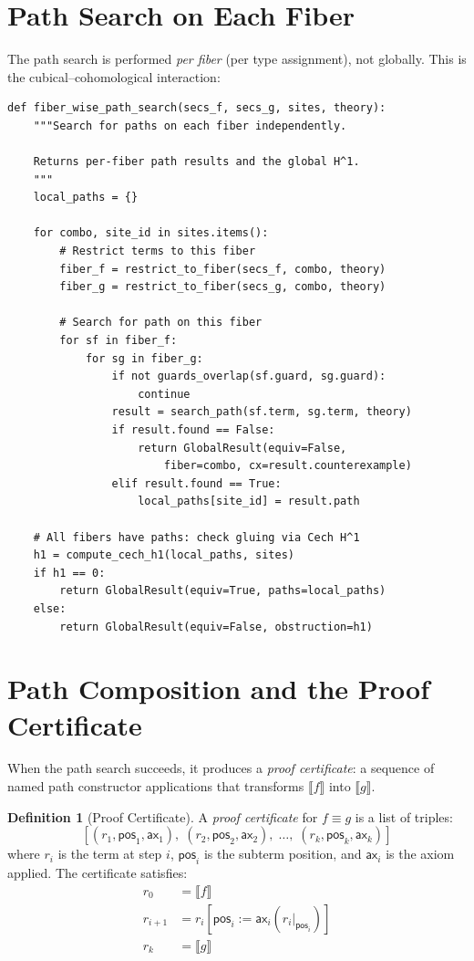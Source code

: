 \documentclass[11pt,a4paper]{report}
\theoremstyle{definition}
\newtheorem{definition}{Definition}[chapter]
\theoremstyle{plain}
\newcommand{\den}[1]{\llbracket #1 \rrbracket}
\begin{document}
\section{Path Search on Each Fiber}

The path search is performed \emph{per fiber} (per type assignment),
not globally.  This is the cubical--cohomological interaction:

\begin{lstlisting}[caption={Fiber-wise path search}]
def fiber_wise_path_search(secs_f, secs_g, sites, theory):
    """Search for paths on each fiber independently.

    Returns per-fiber path results and the global H^1.
    """
    local_paths = {}

    for combo, site_id in sites.items():
        # Restrict terms to this fiber
        fiber_f = restrict_to_fiber(secs_f, combo, theory)
        fiber_g = restrict_to_fiber(secs_g, combo, theory)

        # Search for path on this fiber
        for sf in fiber_f:
            for sg in fiber_g:
                if not guards_overlap(sf.guard, sg.guard):
                    continue
                result = search_path(sf.term, sg.term, theory)
                if result.found == False:
                    return GlobalResult(equiv=False,
                        fiber=combo, cx=result.counterexample)
                elif result.found == True:
                    local_paths[site_id] = result.path

    # All fibers have paths: check gluing via Cech H^1
    h1 = compute_cech_h1(local_paths, sites)
    if h1 == 0:
        return GlobalResult(equiv=True, paths=local_paths)
    else:
        return GlobalResult(equiv=False, obstruction=h1)
\end{lstlisting}

\section{Path Composition and the Proof Certificate}

When the path search succeeds, it produces a \emph{proof certificate}:
a sequence of named path constructor applications that transforms
$\den{f}$ into $\den{g}$.

\begin{definition}[Proof Certificate]
A \emph{proof certificate} for $f \equiv g$ is a list of triples:
\[
  [(r_1, \mathsf{pos}_1, \mathsf{ax}_1),\;
   (r_2, \mathsf{pos}_2, \mathsf{ax}_2),\;
   \ldots,\;
   (r_k, \mathsf{pos}_k, \mathsf{ax}_k)]
\]
where $r_i$ is the term at step $i$, $\mathsf{pos}_i$ is the subterm
position, and $\mathsf{ax}_i$ is the axiom applied.  The certificate
satisfies:
\begin{align}
  r_0 &= \den{f} \\
  r_{i+1} &= r_i[\mathsf{pos}_i := \mathsf{ax}_i(r_i|_{\mathsf{pos}_i})] \\
  r_k &= \den{g}
\end{align}
\end{definition}
\end{document}
